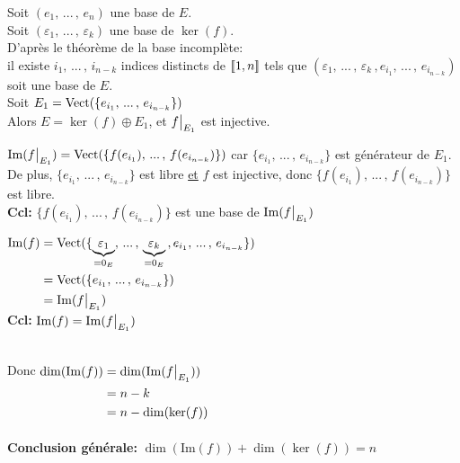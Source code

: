 \documentclass[12pt,twoside,a4paper]{article}
\begin{document}
		\begin{preuve}
			\begin{liste}
				\item Soit $(e_1,\,...\,,\,e_n)$ une base de $E$.\\
					Soit $(\varepsilon_1,\,...\,,\,\varepsilon_k)$ une base de $\ker(f)$.\\
					D'apr\`es le th\'eor\`eme de la base incompl\`ete:\\
					il existe $i_1,\,...\,,\,i_{n-k}$ indices distincts de $[\![1,n]\!]$ tels que $(\varepsilon_1,\,...\,,\,\varepsilon_k\,,e_{i_1},\,...\,,\,e_{i_{n-k}})$ soit une base de $E$.\\
					Soit $E_1=\mathrm{Vect}(\{e_{i_1},\,...\,,\,e_{i_{n-k}}\})$\\
					Alors $E=\ker(f)\oplus E_1$, et $\restr{f}{E_1}$ est injective.
				\item $\mathrm{Im}(\restr{f}{E_1})=\vect(\{f(e_{i_1}),\,...\,,\,f(e_{i_{n-k}})\})$ car $\{e_{i_1},\,...\,,\,e_{i_{n-k}}\}$ est g\'en\'erateur de $E_1$.\\
					De plus, $\{e_{i_1},\,...\,,\,e_{i_{n-k}}\}$ est libre \underline{et} $f$ est injective, donc $\{f(e_{i_1}),\,...\,,\,f(e_{i_{n-k}})\}$ est libre.\\
					\textbf{Ccl:} $\{f(e_{i_1}),\,...\,,\,f(e_{i_{n-k}})\}$ est une base de $\mathrm{Im}(\restr{f}{E_1})$
				\item $\begin{aligned}[t]
					\mathrm{Im}(f) & =\vect(\{\underbrace{\varepsilon_1}_{=0_E},\,...\,,\,\underbrace{\varepsilon_k}_{=0_E}\,,e_{i_1},\,...\,,\,e_{i_{n-k}}\})\\
						& =\vect(\{e_{i_1},\,...\,,\,e_{i_{n-k}} \}) \\
						& =\mathrm{Im}(\restr{f}{E_1})
					\end{aligned}$\\
					\textbf{Ccl:} $\mathrm{Im}(f)=\mathrm{Im}(\restr{f}{E_1})$
			\end{liste}
			\ \\
			Donc $\begin{aligned}[t]
				\dim(\mathrm{Im}(f)) & = \dim(\mathrm{Im}(\restr{f}{E_1}))\\
					& = n-k\\
					& = n-\dim(\ker(f))
			\end{aligned}$\\\\
			\textbf{Conclusion g\'en\'erale:} $\dim(\mathrm{Im}(f)) +\dim(\ker(f))=n$
		\end{preuve}
\end{document}
